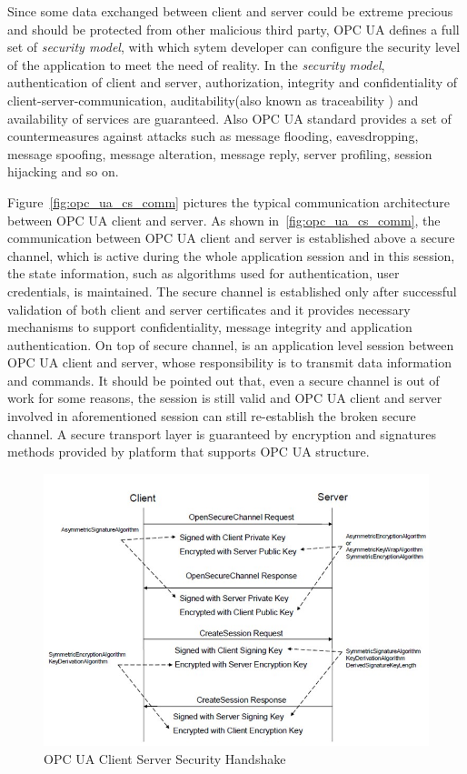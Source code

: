 \documentclass[]{llncs}
\begin{document}
Since some data exchanged between client and server could be extreme precious and should be protected from other malicious third party, OPC UA defines a full set of  \emph{security model}, with which sytem developer can configure the security level of the application to meet the need of reality. In the \emph{security model}, authentication of client and server, authorization, integrity and confidentiality of client-server-communication, auditability(also known as traceability ) and availability of services are guaranteed. Also OPC UA  standard provides a set of countermeasures against attacks such as message flooding, eavesdropping, message spoofing, message alteration, message reply, server profiling, session hijacking and so on\cite{O2}.


Figure~\ref{fig:opc_ua_cs_comm} pictures the typical communication architecture between OPC UA client and server. As shown in~\ref{fig:opc_ua_cs_comm}, the communication between OPC UA client and server is established above a secure channel, which is active during the whole application session and in this session, the state information, such as algorithms used for authentication, user credentials, is maintained. The secure channel is established only after successful validation of both client and server certificates and it provides necessary mechanisms to support confidentiality, message integrity and application authentication. On top of secure channel, is an application level session between OPC UA client and server, whose responsibility is to transmit data information and commands. It should be pointed out that, even a secure channel is out of work for some reasons, the session is still valid and OPC UA client and server involved in aforementioned session can still re-establish the broken secure channel. A secure transport layer is guaranteed by encryption and signatures methods provided by platform that supports OPC UA structure.

\begin{figure}[!htbp]
	\centering
	\includegraphics[width=1\textwidth]{opc_ua_shs.jpg}
		\caption[ ]{OPC UA Client Server Security Handshake\cite{O2}}
	\label{fig:opc_ua_cs_shs}
\end{figure}
\end{document}
